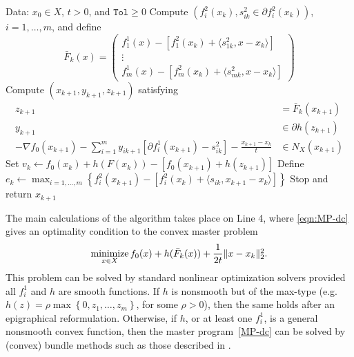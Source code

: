 \documentclass[smallextended,envcountsect]{svjour3}
\newcommand{\norm}[1]{\textstyle{\Vert} #1 \textstyle{\Vert}_2}
\newcommand{\col}[1]{\left\{#1\right\}}
\newcommand{\tol}{\texttt{Tol}}
\newcommand{\inner}[2]{\langle#1,#2\rangle}
\newcommand{\nnmin}{\mathop{\rm minimize}}
\begin{document}
\begin{algorithm}[htb]
\caption{Composite dc Algorithm}
\label{algo-dc}
\begin{algorithmic}[1]
{\footnotesize
\State Data: $x_0 \in X$, $t>0$, and $\tol\geq 0$
 \State Compute $(f_{i}^2(x_k), s_{ik}^2 \in \partial f_{i}^2(x_k))$, $i=1,\ldots,m$, and define 
 \[\bar F_k(x)=\begin{pmatrix}
    f_{1}^1(x)-[f_{1}^2(x_k)+\inner{s^2_{1k}}{x-x_k}]\\
    \vdots \\
    f_{m}^1(x)-[f_{m}^2(x_k)+\inner{s^2_{mk}}{x-x_k}]
\end{pmatrix}
\]
\State Compute $(x_{k+1}, y_{k+1}, z_{k+1})$ satisfying \label{line:xkk}
\begin{subequations}\label{eqn:MP-dc}
\begin{align}
z_{k+1}&=\bar F_k(x_{k+1}) \label{eqn:MP1-dc}\\
y_{k+1} &\in \partial h(z_{k+1})\label{eqn:MP2-dc}\\
-\nabla f_0(x_{k+1}) - \sum_{i=1}^m y_{ik+1} [\partial f_i^1(x_{k+1})-s^2_{ik}] -\frac{x_{k+1}- x_k}{t}  & \in N_X(x_{k+1})\label{eqn:MP3-dc} 
\end{align}
\end{subequations}
\State Set $v_k\gets f_0(x_k)+h(F(x_k)) -[f_0(x_{k+1})+h(z_{k+1}) ]$ 
\State Define $e_{k}\gets \displaystyle\max_{i=1,\ldots,m} \col{f_i^2(x_{k+1}) - [f_i^2(x_k)+\inner{s_{ik}}{x_{k+1}-x_k}]}$
\If{ $v_k\leq \tol$ and $e_k\leq \tol$ }
\State Stop and return $x_{k+1}$%
\EndIf
\EndFor
}
  \end{algorithmic}
\end{algorithm}

The main calculations of the algorithm takes place on Line 4, where \eqref{eqn:MP-dc} gives an optimality condition to the convex master problem
\begin{equation}\label{MP-dc}
\nnmin_{x \in X} f_0(x)+h(\bar F_k(x)) +\frac{1}{2t}\norm{x- x_k}^2.
\end{equation}
This problem can be solved by standard nonlinear optimization solvers provided all $f_i^1$ and $h$ are smooth functions. If $h$ is nonsmooth but of the max-type (e.g. $h(z)=\rho\max\col{0,z_1,\ldots,z_m}$, for some $\rho>0$), then the same holds after an epigraphical reformulation. Otherwise, if $h$, or at least one $f_i^1$, is a general nonsmooth convex function, then the master program~\eqref{MP-dc} can be solved by (convex) bundle methods such as those described in \cite[Chapter~11]{WWBook}.
\end{document}
